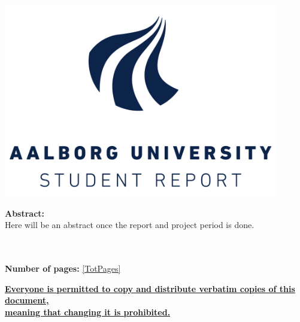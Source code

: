  ~
\begin{minipage}[T]{0.45\textwidth}
 \begin{flushright}
  \includegraphics[width=0.9\textwidth]{images/aau_logo.pdf}\\
 \end{flushright}
 \begin{flushleft}
  \textbf{Abstract:}\\
  Here will be an abstract once the report and project period is done.%
 \end{flushleft}
\end{minipage}\\
\\\large{\textsf{\textbf{\normalsize{Number of pages:}}}} \ref{TotPages}\\
\begin{center}
 \begin{scriptsize}
  \textbf{\underline{Everyone is permitted to copy and distribute verbatim copies of this document,}}\\ \textbf{\underline{ meaning that changing it is prohibited.}}
 \end{scriptsize}
\end{center}
